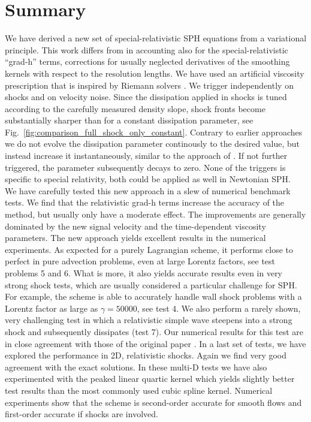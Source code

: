 \documentclass{elsart}
\begin{document}
\section{Summary}

We have derived a new set of special-relativistic SPH equations from a variational principle. This
work differs from \cite{monaghan01} in accounting also for the special-relativistic ``grad-h'' terms, corrections
for usually neglected derivatives of the smoothing kernels with respect to the resolution lengths.
We have used an artificial viscosity prescription that is inspired by  Riemann solvers 
\cite{monaghan97}. We trigger independently on shocks and on velocity noise. Since the dissipation
applied in shocks is tuned according to the carefully measured density slope, shock fronts become 
substantially sharper than for a constant dissipation parameter, see Fig.~\ref{fig:comparison_full_shock_only_constant}. 
Contrary to earlier approaches \cite{morris97,rosswog00} we do not evolve
the dissipation parameter continously to the desired value, but instead increase it instantaneously, similar to the
approach of \cite{cullen10}. If not further triggered, the parameter subsequently decays to zero. None
of the triggers is specific to special relativity, both could be applied as well in Newtonian SPH.\\
We have carefully tested this new approach in a slew of numerical benchmark tests. We find that the 
relativistic grad-h terms increase the accuracy of the method, but usually only have a moderate effect.
The improvements are generally dominated by the new signal velocity and the time-dependent
viscosity parameters. The new approach yields excellent results in the numerical experiments. As expected 
for a purely Lagrangian scheme, it performs close to perfect in pure advection problems, even at large 
Lorentz factors, see test problems 5 and 6. What is more, it also yields accurate results even in very strong 
shock tests, which are usually considered a particular challenge for SPH. For example, the scheme is able to 
accurately handle wall shock problems with a Lorentz factor as large as $\gamma= 50 000$, see test 4. We 
also perform a rarely shown, very challenging test in which a relativistic simple wave steepens into a strong 
shock and subsequently dissipates (test 7). Our numerical results for this test are in close agreement 
with those of the original paper \cite{anile83}.
In a last set of tests, we have explored the performance in 2D, relativistic shocks. Again we find very good 
agreement with the exact solutions. In these multi-D tests we have also experimented with the peaked 
linear quartic kernel \cite{valcke10} which yields slightly better test results than the most commonly 
used cubic spline kernel. Numerical experiments \cite{rosswog10d} show that the scheme is 
second-order accurate for smooth flows and first-order accurate if shocks are involved.
\end{document}
